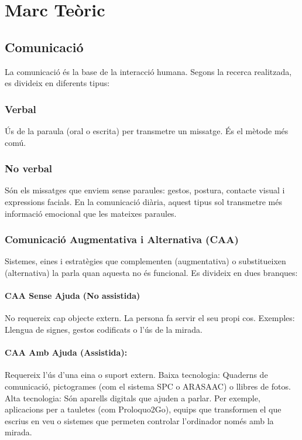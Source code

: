 \chapter{Marc Teòric}

\section{Comunicació}
La comunicació és la base de la interacció humana. Segons la recerca realitzada, es divideix en diferents tipus:

\subsection{Verbal} 
Ús de la paraula (oral o escrita) per transmetre un missatge. És el mètode més comú.

\subsection*{No verbal}
Són els missatges que enviem sense paraules: gestos, postura, contacte visual i expressions facials. En la comunicació diària, aquest tipus sol transmetre més informació emocional que les mateixes paraules.

\subsection*{Comunicació Augmentativa i Alternativa (CAA)}
Sistemes, eines i estratègies que complementen (augmentativa) o substitueixen (alternativa) la parla quan aquesta no és funcional. Es divideix en dues branques:

\subsubsection{CAA Sense Ajuda (No assistida)}
No requereix cap objecte extern. La persona fa servir el seu propi cos.
{Exemples:} Llengua de signes, gestos codificats o l'ús de la mirada.

\subsubsection{CAA Amb Ajuda (Assistida):} Requereix l'ús d'una eina o suport extern.
{Baixa tecnologia:} Quaderns de comunicació, pictogrames (com el sistema SPC o ARASAAC) o llibres de fotos.
{Alta tecnologia:} Són aparells digitals que ajuden a parlar. Per exemple, aplicacions per a tauletes (com Proloquo2Go), equips que transformen el que escrius en veu o sistemes que permeten controlar l'ordinador només amb la mirada.



